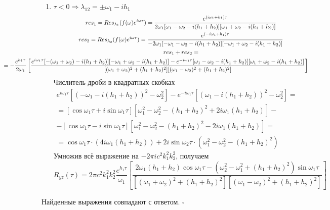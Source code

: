 \documentclass[a4paper,12pt]{article}
\begin{document}
\begin{enumerate}
    \item $\tau < 0  \Rightarrow \lambda_{12} = \pm \omega_1 - ih_1$
    \begin{gather*}
        res_1 = Res_{\lambda_1}(f(\omega) e^{i\omega \tau}) = \frac{e^{(i\omega_1+h_1)\tau}}{ 2 \omega_1 [\omega_1-\omega_2-i(h_1+h_2)][\omega_1+\omega_2-i(h_1+h_2)] } \\
        res_2 = Res_{\lambda_2}(f(\omega) e^{i\omega \tau}) = \frac{e^{(-i\omega_1+h_1)\tau}}{ -2 \omega_1 [-\omega_1-\omega_2-i(h_1+h_2)][-\omega_1+\omega_2-i(h_1+h_2)] } \\
        res_1+res_2 = \\
        \hspace{-3cm}
        = -\frac{e^{h_1\tau}}{2\omega_1} \left[ \frac{e^{i\omega_1\tau} [-(\omega_1+\omega_2)-i(h_1+h_2)][-\omega_1+\omega_2-i(h_1+h_2)]-e^{-i\omega_1\tau}[\omega_1-\omega_2-i(h_1+h_2)][\omega_1+\omega_2-i(h_1+h_2)] }{ [(\omega_1+\omega_2)^2+(h_1+h_2)^2][(\omega_1-\omega_2)^2+(h_1+h_2)^2] } \right]
    \end{gather*}
    Числитель дроби в квадратных скобках
    \begin{gather*}
        e^{i\omega_1\tau}[(-\omega_1-i(h_1+h_2))^2-\omega_2^2]-e^{-i\omega_1\tau}[(\omega_1-i(h_1+h_2))^2-\omega_2^2] = \\
        = [\cos \omega_1\tau + i \sin \omega_1\tau][\omega_1^2-\omega_2^2-(h_1+h_2)^2+2i\omega_1(h_1+h_2)]- \\
        - [\cos \omega_1\tau - i \sin \omega_1\tau][\omega_1^2-\omega_2^2-(h_1+h_2)^2-2i\omega_1(h_1+h_2)] = \\
        = \cos \omega_1\tau \cdot (4i\omega_1(h_1+h_2)) + 2i \sin \omega_2\tau \cdot (\omega_1^2-\omega_2^2-(h_1+h_2)^2)
    \end{gather*}
    Умножив всё выражение на $- 2\pi i c^2 k_1^2 k_2^2  $, получаем
    \[ \boxed{ R_{yz}(\tau) = 2\pi c^2 k_1^2 k_2^2 \frac{e^{h_1\tau}}{\omega_1} \left[ \frac{ 2\omega_1(h_1+h_2) \cos \omega_1\tau - (\omega_2^2-\omega_1^2+(h_1+h_2)^2) \sin \omega_1\tau}{ [(\omega_1+\omega_2)^2+(h_1+h_2)^2][(\omega_1-\omega_2)^2+(h_1+h_2)^2] } \right] } \]
\end{enumerate}

Найденные выражения совпадают с ответом. $\square$
\end{document}
